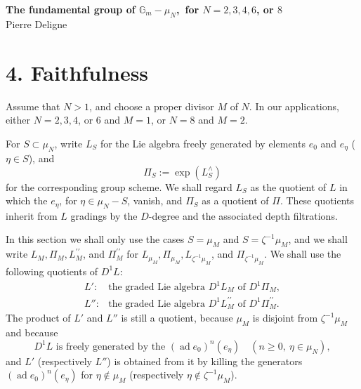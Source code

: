 \documentclass[10pt,a4paper]{article}
\newcommand{\Gm}{\mathbb G_m}
\newcommand{\ad}{\operatorname{ad}}
\theoremstyle{deligne}
\newcommand{\heading}[1]{\vspace{0.65em}\noindent{\bfseries #1}\quad}
\begin{document}
\begin{center}
{\Large\bfseries The fundamental group of \(\Gm-\mu_N\),\ for \(N=2,3,4,6\), or \(8\)}\\[0.4em]
{\large Pierre Deligne}
\end{center}

\section*{4. Faithfulness}

Assume that \(N>1\), and choose a proper divisor \(M\) of \(N\). In our applications, either \(N=2,3,4\), or \(6\) and \(M=1\), or \(N=8\) and \(M=2\).

\heading{4.1.} For \(S\subset\mu_N\), write \(L_S\) for the Lie algebra freely generated by elements \(e_0\) and \(e_\eta\) (\(\eta\in S\)), and
\[
\Pi_S:=\exp(L_S^{\wedge})
\]
for the corresponding group scheme. We shall regard \(L_S\) as the quotient of \(L\) in which the \(e_\eta\), for \(\eta\in\mu_N-S\), vanish, and \(\Pi_S\) as a quotient of \(\Pi\). These quotients inherit from \(L\) gradings by the \(D\)-degree and the associated depth filtrations.

In this section we shall only use the cases \(S=\mu_M\) and \(S=\zeta^{-1}\mu_M\), and we shall write \(L_M,\Pi_M,L_M^{\prime\prime}\), and \(\Pi_M^{\prime\prime}\) for \(L_{\mu_M},\Pi_{\mu_M},L_{\zeta^{-1}\mu_M}\), and \(\Pi_{\zeta^{-1}\mu_M}\). We shall use the following quotients of \(D^1L\):
\[
\begin{array}{ll}
L': & \text{the graded Lie algebra }D^1L_M\text{ of }D^1\Pi_M,\\
L'':& \text{the graded Lie algebra }D^1L_M^{\prime\prime}\text{ of }D^1\Pi_M^{\prime\prime}.
\end{array}
\]
The product of \(L'\) and \(L''\) is still a quotient, because \(\mu_M\) is disjoint from \(\zeta^{-1}\mu_M\) and because
\[
\tag{4.1.1}
D^1L\text{ is freely generated by the }(\ad e_0)^n(e_\eta)\quad(n\ge0,\ \eta\in\mu_N),
\]
and \(L'\) (respectively \(L''\)) is obtained from it by killing the generators \((\ad e_0)^n(e_\eta)\) for \(\eta\notin\mu_M\) (respectively \(\eta\notin\zeta^{-1}\mu_M\)).
\end{document}
